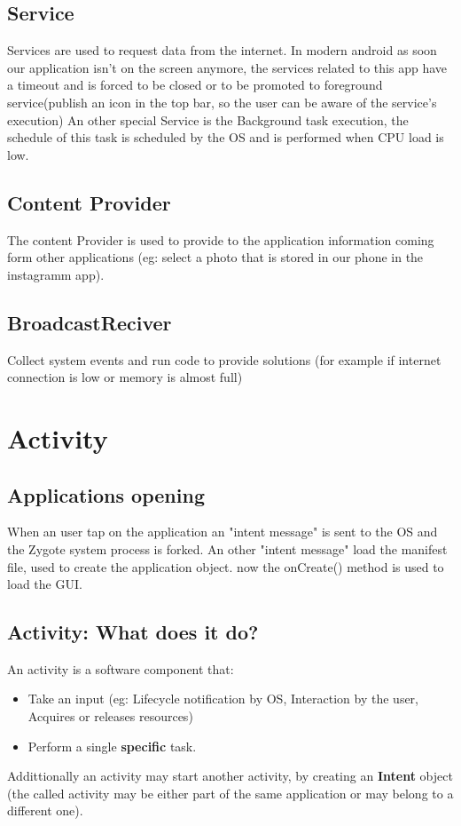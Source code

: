 \documentclass[12pt]{article}
\begin{document}
\subsection{Service}
Services are used to request data from the internet. In modern android as soon our application isn't on the screen anymore, the services related to this app have a timeout and is forced to be closed or to be promoted to foreground service(publish an icon in the top bar, so the user can be aware of the service's execution)
An other special Service is the Background task execution, the schedule of this task is scheduled by the OS and is performed when CPU load is low.
\subsection{Content Provider}
The content Provider is used to provide to the application information coming form other applications (eg: select a photo that is stored in our phone in the instagramm app). 
\subsection{BroadcastReciver}
Collect system events and run code to provide solutions (for example if internet connection is low or memory is almost full)
\newpage


\section{Activity}
\subsection{Applications opening}
When an user tap on the application an "intent message" is sent to the OS and the Zygote system process is forked. An other "intent message" load the manifest file, used to create the application object. now the onCreate() method is used to load the GUI.\\
\subsection{Activity: What does it do?}
An activity is a software component that:\\
\begin{itemize}
	\item Take an input (eg: Lifecycle notification by OS, Interaction by the user, Acquires or releases resources)
	\item Perform a single \textbf{specific} task.
\end{itemize}
Addittionally an activity may start another activity, by creating an \textbf{Intent} object (the called activity may be either part of the same application or may belong to a different one). 
\end{document}
